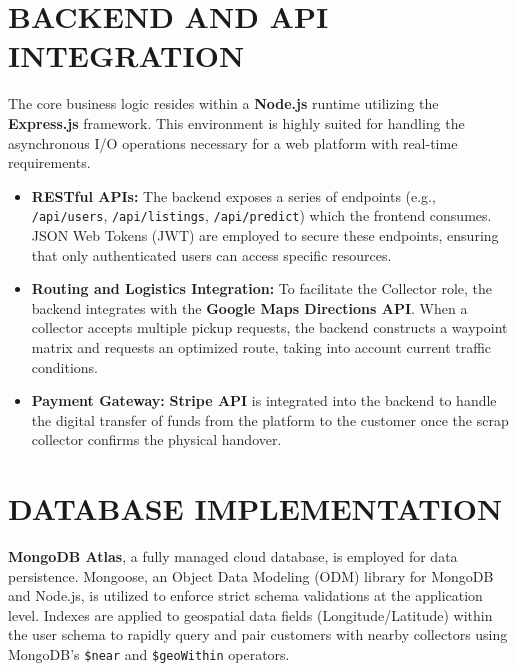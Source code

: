\section{BACKEND AND API INTEGRATION}
The core business logic resides within a \textbf{Node.js} runtime utilizing the \textbf{Express.js} framework. This environment is highly suited for handling the asynchronous I/O operations necessary for a web platform with real-time requirements.
\begin{itemize}
    \item \textbf{RESTful APIs:} The backend exposes a series of endpoints (e.g., \texttt{/api/users}, \texttt{/api/listings}, \texttt{/api/predict}) which the frontend consumes. JSON Web Tokens (JWT) are employed to secure these endpoints, ensuring that only authenticated users can access specific resources.
    \item \textbf{Routing and Logistics Integration:} To facilitate the Collector role, the backend integrates with the \textbf{Google Maps Directions API}. When a collector accepts multiple pickup requests, the backend constructs a waypoint matrix and requests an optimized route, taking into account current traffic conditions.
    \item \textbf{Payment Gateway:} \textbf{Stripe API} is integrated into the backend to handle the digital transfer of funds from the platform to the customer once the scrap collector confirms the physical handover.
\end{itemize}

\section{DATABASE IMPLEMENTATION}
\textbf{MongoDB Atlas}, a fully managed cloud database, is employed for data persistence. Mongoose, an Object Data Modeling (ODM) library for MongoDB and Node.js, is utilized to enforce strict schema validations at the application level. Indexes are applied to geospatial data fields (Longitude/Latitude) within the user schema to rapidly query and pair customers with nearby collectors using MongoDB's \texttt{\$near} and \texttt{\$geoWithin} operators.

